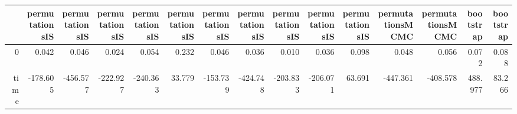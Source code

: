 \begin{table}[ht]
\centering
\begingroup\tiny
\begin{tabular}{rrrrrrrrrrrrrrr}
  \hline
 & permutationsIS & permutationsIS & permutationsIS & permutationsIS & permutationsIS & permutationsIS & permutationsIS & permutationsIS & permutationsIS & permutationsIS & permutationsMCMC & permutationsMCMC & bootstrap & bootstrap \\ 
  \hline
0 & 0.042 & 0.046 & 0.024 & 0.054 & 0.232 & 0.046 & 0.036 & 0.010 & 0.036 & 0.098 & 0.048 & 0.056 & 0.072 & 0.088 \\ 
  time & -178.605 & -456.577 & -222.927 & -240.363 & 33.779 & -153.739 & -424.748 & -203.833 & -206.071 & 63.691 & -447.361 & -408.578 & 488.977 & 83.266 \\ 
   \hline
\end{tabular}
\endgroup
\end{table}
